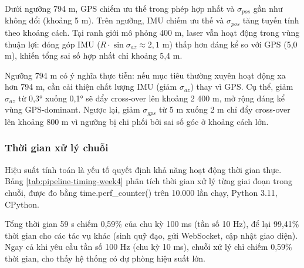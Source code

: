 Dưới ngưỡng 794 m, GPS chiếm ưu thế trong phép hợp nhất và $\sigma_{pos}$ gần như không đổi (khoảng 5 m). Trên ngưỡng, IMU chiếm ưu thế và $\sigma_{pos}$ tăng tuyến tính theo khoảng cách. Tại ranh giới mô phỏng 400 m, laser vẫn hoạt động trong vùng thuận lợi: đóng góp IMU ($R \cdot \sin\sigma_{az} \approx 2{,}1$ m) thấp hơn đáng kể so với GPS (5,0 m), khiến tổng sai số hợp nhất chỉ khoảng 5,4 m.

Ngưỡng 794 m có ý nghĩa thực tiễn: nếu mục tiêu thường xuyên hoạt động xa hơn 794 m, cần cải thiện chất lượng IMU (giảm $\sigma_{az}$) thay vì GPS. Cụ thể, giảm $\sigma_{az}$ từ 0,3° xuống 0,1° sẽ đẩy cross-over lên khoảng 2 400 m, mở rộng đáng kể vùng GPS-dominant. Ngược lại, giảm $\sigma_{gps}$ từ 5 m xuống 2 m chỉ đẩy cross-over lên khoảng 800 m vì ngưỡng bị chi phối bởi sai số góc ở khoảng cách lớn.

\subsubsection{Thời gian xử lý chuỗi}

\hspace{0.5cm} Hiệu suất tính toán là yếu tố quyết định khả năng hoạt động thời gian thực. Bảng \ref{tab:pipeline-timing-week4} phân tích thời gian xử lý từng giai đoạn trong chuỗi, được đo bằng time.perf\_counter() trên 10.000 lần chạy, Python 3.11, CPython.

\begin{table}[H]
\centering
\caption{Thời gian xử lý chuỗi (trung bình 10.000 lần chạy)}
\label{tab:pipeline-timing-week4}
\end{table}

Tổng thời gian 59 \textmu s chiếm 0,59\% của chu kỳ 100 ms (tần số 10 Hz), để lại 99,41\% thời gian cho các tác vụ khác (sinh quỹ đạo, gửi WebSocket, cập nhật giao diện). Ngay cả khi yêu cầu tần số 100 Hz (chu kỳ 10 ms), chuỗi xử lý chỉ chiếm 0,59\% thời gian, cho thấy hệ thống có dự phòng hiệu suất lớn.

